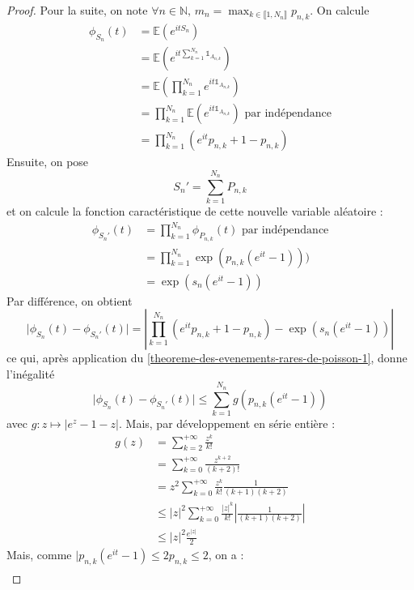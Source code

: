   \begin{proof}
    Pour la suite, on note $\forall n \in \mathbb{N}, \, m_n = \max_{k \in \llbracket 1, N_n \rrbracket} p_{n,k}$. On calcule
    \begin{align*}
      \phi_{S_n}(t) &= \mathbb{E} \left(e^{itS_n} \right) \\
      &= \mathbb{E} \left(e^{it \sum_{k=1}^{N_n} \mathbb{1}_{A_{n,k}}} \right) \\
      &= \mathbb{E} \left(\prod_{k=1}^{N_n} e^{it \mathbb{1}_{A_{n,k}}} \right) \\
      &= \prod_{k=1}^{N_n} \mathbb{E} \left(e^{it \mathbb{1}_{A_{n,k}}} \right) \text{ par indépendance} \\
      &= \prod_{k=1}^{N_n} \left( e^{it} p_{n,k} + 1 - p_{n,k} \right)
    \end{align*}
    Ensuite, on pose
    \[ S_n' = \sum_{k=1}^{N_n} P_{n,k} \]
    et on calcule la fonction caractéristique de cette nouvelle variable aléatoire :
    \begin{align*}
      \phi_{S_n'}(t) &= \prod_{k=1}^{N_n} \phi_{P_{n,k}} (t) \text{ par indépendance} \\
      &= \prod_{k=1}^{N_n} \exp ( p_{n,k}(e^{it} - 1 ))) \\
      &= \exp(s_n(e^{it} - 1))
    \end{align*}
    Par différence, on obtient
    \[ \vert \phi_{S_n}(t) - \phi_{S_n'}(t) \vert = \left| \prod_{k=1}^{N_n} \left( e^{it} p_{n,k} + 1 - p_{n,k} \right) - \exp(s_n(e^{it} - 1)) \right| \]
    ce qui, après application du \cref{theoreme-des-evenements-rares-de-poisson-1}, donne l'inégalité
    \[ \vert \phi_{S_n}(t) - \phi_{S_n'}(t) \vert \leq \sum_{k=1}^{N_n} g(p_{n,k}(e^{it}-1)) \]
    avec $g : z \mapsto \vert e^z - 1 - z \vert$. Mais, par développement en série entière :
    \begin{align*}
      g(z) &= \sum_{k=2}^{+\infty} \frac{z^k}{k!} \\
      &= \sum_{k=0}^{+\infty} \frac{z^{k+2}}{(k+2)!} \\
      &= z^2 \sum_{k=0}^{+\infty} \frac{z^k}{k!} \frac{1}{(k+1)(k+2)} \\
      &\leq \vert z \vert^2 \sum_{k=0}^{+\infty} \frac{\vert z \vert^k}{k!} \left| \frac{1}{(k+1)(k+2)} \right| \\
      &\leq \vert z \vert^2 \frac{e^{\vert z \vert}}{2}
    \end{align*}
    Mais, comme $\vert p_{n,k}(e^{it} - 1) \leq 2 p_{n,k} \leq 2$, on a :
    \begin{align*}

\end{align*}
\end{proof}
